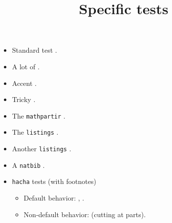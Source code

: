 \documentclass{article}
\title{Specific tests}
\author{}
\date{}
\begin{document}
\maketitle
\begin{itemize}
\item Standard test .
\item A lot of .
\item Accent .
\item Tricky .
\item The \texttt{mathpartir} .
\item The \texttt{listings} .
\item Another \texttt{listings} .
\item A \texttt{natbib} .
\item \texttt{hacha} tests (with footnotes)
\begin{itemize}
\item Default behavior: ,
.
\item Non-default behavior: 
(cutting at parts).
\end{itemize}
\end{itemize}
\end{document}

